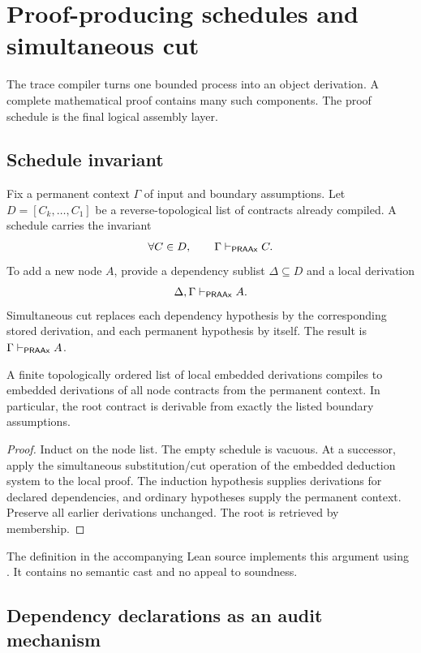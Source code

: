 \section{Proof-producing schedules and simultaneous cut}
\label{sec:proof-schedule}

The trace compiler turns one bounded process into an object derivation.  A complete
mathematical proof contains many such components.  The proof schedule is the final
logical assembly layer.

\subsection{Schedule invariant}

Fix a permanent context \(\Gamma\) of input and boundary assumptions.  Let
\(D=[C_k,\ldots,C_1]\) be a reverse-topological list of contracts already compiled.
A schedule carries the invariant
\[
  \forall C\in D,\qquad \Gamma\vdash_{\mathsf{PRAAx}} C.
\]
To add a new node \(A\), provide a dependency sublist \(\Delta\subseteq D\) and a local
derivation
\[
  \Delta,\Gamma\vdash_{\mathsf{PRAAx}}A.
\]
Simultaneous cut replaces each dependency hypothesis by the corresponding stored
derivation, and each permanent hypothesis by itself.  The result is
\(\Gamma\vdash_{\mathsf{PRAAx}}A\).

\begin{theorem}
\label{thm:proof-schedule}
A finite topologically ordered list of local embedded derivations compiles to embedded
derivations of all node contracts from the permanent context.  In particular, the
root contract is derivable from exactly the listed boundary assumptions.
\end{theorem}

\begin{proof}
Induct on the node list.  The empty schedule is vacuous.  At a successor, apply the
simultaneous substitution/cut operation of the embedded deduction system to the local
proof.  The induction hypothesis supplies derivations for declared dependencies, and
ordinary hypotheses supply the permanent context.  Preserve all earlier derivations
unchanged.  The root is retrieved by membership.
\end{proof}

The  definition in the accompanying Lean source implements this
argument using .  It contains no semantic cast and no appeal to
soundness.

\subsection{Dependency declarations as an audit mechanism}

